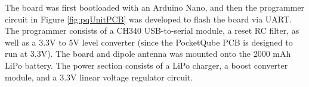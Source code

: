 The board was first bootloaded with an Arduino Nano, and then the programmer circuit in Figure \ref{fig:pqUnitPCB} was developed to flash the board via UART. The programmer consists of a CH340 USB-to-serial module, a reset RC filter, as well as a 3.3V to 5V level converter (since the PocketQube PCB is designed to run at 3.3V). The board and dipole antenna was mounted onto the 2000 mAh LiPo battery. The power section consists of a LiPo charger, a boost converter module, and a 3.3V linear voltage regulator circuit.